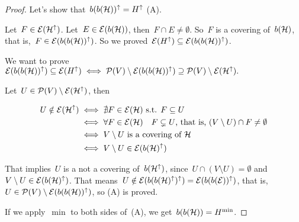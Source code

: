 \documentclass[main.tex]{subfiles}
\begin{document}
\begin{proof}
	Let's show that~$b(b(\mathcal{H}))^\uparrow = H^\uparrow$ (A).

	Let~$F \in \mathcal{E}(\mathcal{H}^\uparrow)$. Let~${E \in \mathcal{E}(b(\mathcal{H}))}$, then~${F \cap E \neq \emptyset}$. So~$F$ is a covering of~$b(\mathcal{H})$, that is,~${F \in \mathcal{E}(b(b(\mathcal{H}))^\uparrow)}$. So we proved~${\mathcal{E}(H^\uparrow) \subseteq \mathcal{E}(b(b(\mathcal{H}))^\uparrow)}$.

	We want to prove~${\mathcal{E}(b(b(\mathcal{H}))^\uparrow) \subseteq \mathcal{E}(H^\uparrow) \iff \mathcal{P}(V) \setminus \mathcal{E}(b(b(\mathcal{H}))^\uparrow) \supseteq \mathcal{P}(V) \setminus \mathcal{E}(\mathcal{H}^\uparrow).}$

	Let~${U \in \mathcal{P}(V) \setminus \mathcal{E}(\mathcal{H}^\uparrow)}$, then

	\begin{align*}
		U \notin \mathcal{E}(\mathcal{H}^\uparrow) & \iff \nexists F \in \mathcal{E}(\mathcal{H}) \text{ s.t. } F \subseteq U \\
		& \iff \forall F \in \mathcal{E}(\mathcal{H}) \quad F \subsetneq U \text{, that is, } (V \setminus U) \cap F \neq \emptyset \\
		& \iff V \setminus U \text{ is a covering of } \mathcal{H} \\
		& \iff V \setminus U \in \mathcal{E}(b(\mathcal{H})^\uparrow)
	\end{align*}

	That implies~$U$ is a not a covering of~$b(\mathcal{H}^\uparrow)$, since~$U \cap (V \setminus U) = \emptyset$ and~${V \setminus U \in \mathcal{E}(b(\mathcal{H})^\uparrow)}$. That means~${U \notin \mathcal{E}(b(b(\mathcal{H})^\uparrow)^\uparrow) = \mathcal{E}(b(b(\mathcal{E}))^\uparrow)}$, that is,~${U \in \mathcal{P}(V) \setminus \mathcal{E}(b(b(\mathcal{H}))^\uparrow)}$, so (A) is proved.

	If we apply~${\min}$ to both sides of~(A), we get~${b(b(\mathcal{H})) = H^{\min}}$.
\end{proof}
\end{document}
